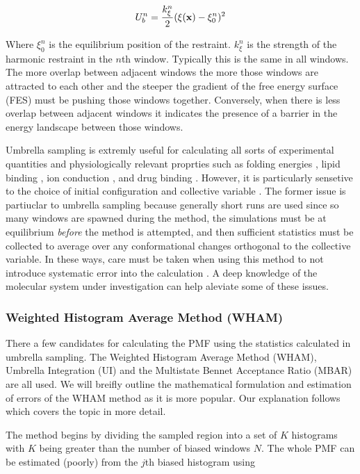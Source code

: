 \begin{equation}
	U_{b}^n = \frac{k^n_{\xi}}{2}(\xi(\bold{x}) - \xi_0^n)^2
	\label{umbrella_bias}
\end{equation}

Where $\xi_0^n$ is the equilibrium position of the restraint. $k_{\xi}^n$ is the strength of the harmonic restraint in the $n$th window. Typically this is the same in all windows. The more overlap between adjacent windows the more those windows are attracted to each other and the steeper the gradient of the free energy surface (FES) must be pushing those windows together. Conversely, when there is less overlap between adjacent windows it indicates the presence of a barrier in the energy landscape between those windows.

Umbrella sampling is extremly useful for calculating all sorts of experimental quantities and physiologically relevant proprties such as folding energies \cite{meshkin2017}, lipid binding \cite{domanski2017}, ion conduction \cite{zhu2012b}, and drug binding \cite{subramanian2019}. However, it is particularly sensetive to the choice of initial configuration and collective variable \cite{domanski2017}. The former issue is partiuclar to umbrella sampling because generally short runs are used since so many windows are spawned during the method, the simulations must be at equilibrium \textit{before} the method is attempted, and then sufficient statistics must be collected to average over any conformational changes orthogonal to the collective variable. In these ways, care must be taken when using this method to not introduce systematic error into the calculation \cite{you2019}. A deep knowledge of the molecular system under investigation can help aleviate some of these issues. 

\subsubsection{Weighted Histogram Average Method (WHAM)}
There a few candidates for calculating the PMF using the statistics calculated in umbrella sampling. The Weighted Histogram Average Method (WHAM)\cite{kumar1992}, Umbrella Integration (UI)\cite{kastner2005} and the Multistate Bennet Acceptance Ratio (MBAR)\cite{kim2012} are all used. We will breifly outline the mathematical formulation and estimation of errors of the WHAM method as it is more popular\cite{zhu2012}. Our explanation follows \cite{kastner2011} which covers the topic in more detail.

The method begins by dividing the sampled region into a set of $K$ histograms with $K$ being greater than the number of biased windows $N$.  The whole PMF can be estimated (poorly) from the $j$th biased histogram using 

